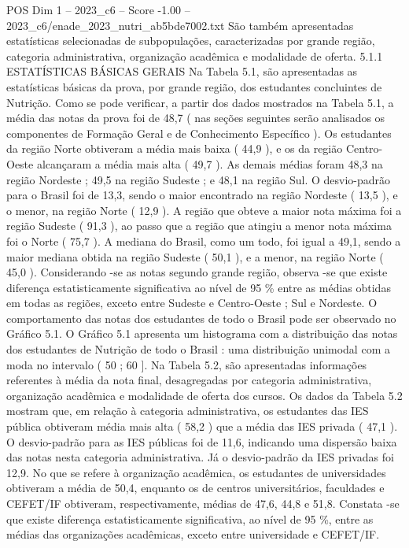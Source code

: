 \begin{textsample}{POS Dim 1 – 2023\_c6 – Score -1.00 – 2023\_c6/enade\_2023\_nutri\_ab5bde7002.txt}
São também apresentadas estatísticas selecionadas de subpopulações, caracterizadas por grande região, categoria administrativa, organização acadêmica e modalidade de oferta. 5.1.1 ESTATÍSTICAS BÁSICAS GERAIS Na Tabela 5.1, são apresentadas as estatísticas básicas da prova, por grande região, dos estudantes concluintes de Nutrição.
Como se pode verificar, a partir dos dados mostrados na Tabela 5.1, a média das notas da prova foi de 48,7 ( nas seções seguintes serão analisados os componentes de Formação Geral e de Conhecimento Específico ).
Os estudantes da região Norte obtiveram a média mais baixa ( 44,9 ), e os da região Centro-Oeste alcançaram a média mais alta ( 49,7 ).
As demais médias foram 48,3 na região Nordeste ; 49,5 na região Sudeste ; e 48,1 na região Sul.
O desvio-padrão para o Brasil foi de 13,3, sendo o maior encontrado na região Nordeste ( 13,5 ), e o menor, na região Norte ( 12,9 ).
A região que obteve a maior nota máxima foi a região Sudeste ( 91,3 ), ao passo que a região que atingiu a menor nota máxima foi o Norte ( 75,7 ).
A mediana do Brasil, como um todo, foi igual a 49,1, sendo a maior mediana obtida na região Sudeste ( 50,1 ), e a menor, na região Norte ( 45,0 ).
Considerando -se as notas segundo grande região, observa -se que existe diferença estatisticamente significativa ao nível de 95 \% entre as médias obtidas em todas as regiões, exceto entre Sudeste e Centro-Oeste ; Sul e Nordeste.
O comportamento das notas dos estudantes de todo o Brasil pode ser observado no Gráfico 5.1.
O Gráfico 5.1 apresenta um histograma com a distribuição das notas dos estudantes de Nutrição de todo o Brasil : uma distribuição unimodal com a moda no intervalo ( 50 ; 60 ].
Na Tabela 5.2, são apresentadas informações referentes à média da nota final, desagregadas por categoria administrativa, organização acadêmica e modalidade de oferta dos cursos.
Os dados da Tabela 5.2 mostram que, em relação à categoria administrativa, os estudantes das IES pública obtiveram média mais alta ( 58,2 ) que a média das IES privada ( 47,1 ).
O desvio-padrão para as IES públicas foi de 11,6, indicando uma dispersão baixa das notas nesta categoria administrativa.
Já o desvio-padrão da IES privadas foi 12,9.
No que se refere à organização acadêmica, os estudantes de universidades obtiveram a média de 50,4, enquanto os de centros universitários, faculdades e CEFET/IF obtiveram, respectivamente, médias de 47,6, 44,8 e 51,8.
Constata -se que existe diferença estatisticamente significativa, ao nível de 95 \%, entre as médias das organizações acadêmicas, exceto entre universidade e CEFET/IF.

\end{textsample}
